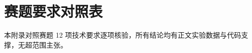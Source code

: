 
\appendix
{}

\newcommand{\apptabtitle}[1]{\par\medskip\noindent\textbf{#1}\par\nopagebreak[3]}
\newcommand{\apptabnote}[1]{\par\vspace{2pt}{\footnotesize #1}\par\medskip}
\newcommand{\apptabhead}[1]{\textbf{#1}}

\section{赛题要求对照表}

本附录对照赛题 12 项技术要求逐项核验，所有结论均有正文实验数据与代码支撑，无超范围主张。

